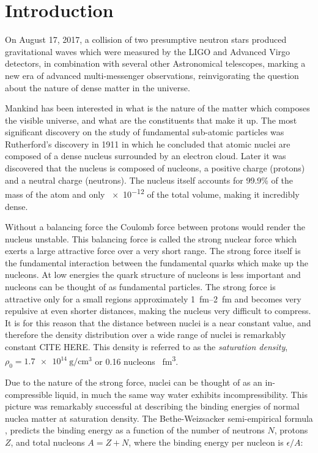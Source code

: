 \chapter{Introduction}
On August 17, 2017, a collision of two presumptive neutron stars produced gravitational waves which were measured by the LIGO and Advanced Virgo detectors, in combination with several other Astronomical telescopes, marking a new era of advanced multi-messenger observations, reinvigorating the question about the nature of dense matter in the universe.

Mankind has been interested in what is the nature of the matter which composes the visible universe, and what are the constituents that make it up. The most significant discovery on the study of fundamental sub-atomic particles was Rutherford's discovery in 1911 in which he concluded that atomic nuclei are composed of a dense nucleus surrounded by an electron cloud. Later it was discovered that the nucleus is composed of nucleons, a positive charge (protons) and a neutral charge (neutrons). The nucleus itself accounts for 99.9\% of the mass of the atom and only \num{e-12} of the total volume, making it incredibly dense. 

Without a balancing force the Coulomb force between protons would render the nucleus unstable. This balancing force is called the strong nuclear force which exerts a large attractive force over a very short range. The strong force itself is the fundamental interaction between the fundamental quarks which make up the nucleons. At low energies the quark structure of nucleons is less important and nucleons can be thought of as fundamental particles. The strong force is attractive only for a small regions approximately \SIrange{1}{2}{\femto\metre} and becomes very repulsive at even shorter distances, making the nucleus very difficult to compress. It is for this reason that the distance between nuclei is a near constant value, and therefore the density distribution over a wide range of nuclei is remarkably constant CITE HERE. This density is referred to as the  \emph{saturation density}, $\rho_0 = \SI{1.7e14}{\gram\per\centi\metre\cubed}$ or \num{0.16} nucleons \si{\per\femto\metre\cubed}.  

Due to the nature of the strong force, nuclei can be thought of as an in-compressible liquid, in much the same way water exhibits incompressibility. This picture was remarkably successful at describing the binding energies of normal nuclea matter at saturation density. The Bethe-Weizsacker semi-empirical formula \cite{awayforward}, predicts the binding energy as a function of the number of neutrons $N$, protons $Z$, and total nucleons $A = Z + N$, where the binding energy per nucleon is $\epsilon/A$:
 
